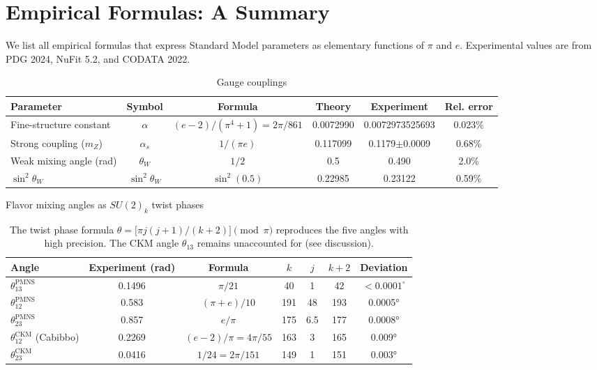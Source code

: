 ﻿\documentclass[twocolumn]{article}
\begin{document}
\section{Empirical Formulas: A Summary}
We list all empirical formulas that express Standard Model parameters as elementary functions of \(\pi\) and \(e\). Experimental values are from PDG 2024, NuFit 5.2, and CODATA 2022.

\begin{table}[htbp]
\centering
\caption{Gauge couplings}
\begin{tabular}{lccccc}
\toprule
Parameter & Symbol & Formula & Theory & Experiment & Rel. error \\
\midrule
Fine-structure constant & \(\alpha\) & \((e-2)/(\pi^4+1) = 2\pi/861\) & 0.0072990 & 0.0072973525693 & 0.023\% \\
Strong coupling (\(m_Z\)) & \(\alpha_s\) & \(1/(\pi e)\) & 0.117099 & 0.1179\(\pm\)0.0009 & 0.68\% \\
Weak mixing angle (rad) & \(\theta_W\) & \(1/2\) & 0.5 & 0.490 & 2.0\% \\
\(\sin^2\theta_W\) & \(\sin^2\theta_W\) & \(\sin^2(0.5)\) & 0.22985 & 0.23122 & 0.59\% \\
\bottomrule
\end{tabular}
\end{table}

\begin{table}[htbp]
\centering
\caption{Flavor mixing angles as \(SU(2)_k\) twist phases}
\begin{tabular}{lcccccc}
\toprule
Angle & Experiment (rad) & Formula & \(k\) & \(j\) & \(k+2\) & Deviation \\
\midrule
\(\theta_{13}^{\text{PMNS}}\) & 0.1496 & \(\pi/21\) & 40 & 1 & 42 & \(<0.0001^\circ\) \\
\(\theta_{12}^{\text{PMNS}}\) & 0.583 & \((\pi+e)/10\) & 191 & 48 & 193 & 0.0005° \\
\(\theta_{23}^{\text{PMNS}}\) & 0.857 & \(e/\pi\) & 175 & 6.5 & 177 & 0.0008° \\
\(\theta_{12}^{\text{CKM}}\) (Cabibbo) & 0.2269 & \((e-2)/\pi = 4\pi/55\) & 163 & 3 & 165 & 0.009° \\
\(\theta_{23}^{\text{CKM}}\) & 0.0416 & \(1/24 = 2\pi/151\) & 149 & 1 & 151 & 0.003° \\
\bottomrule
\end{tabular}
\caption*{The twist phase formula \(\theta = \bigl[\pi j(j+1)/(k+2)\bigr] \pmod{\pi}\) reproduces the five angles with high precision. The CKM angle \(\theta_{13}\) remains unaccounted for (see discussion).}
\end{table}
\end{document}
